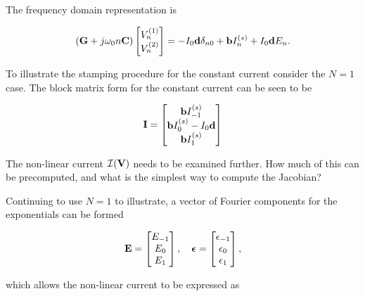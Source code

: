 \documentclass[12pt,journal,compsoc]{../ieeepaper/IEEEtran}
\begin{document}
The frequency domain representation is

\begin{equation}\label{eqn:ece1254projectReport:820}
\lr{ \BG + j \omega_0 n \BC } 
\begin{bmatrix}
V^{(1)}_n \\
V^{(2)}_n \\
\end{bmatrix}
=
-I_0 \Bd \delta_{n 0}
+
\Bb I^{(s)}_n
+ I_0 \Bd E_n.
\end{equation}

To illustrate the stamping procedure for the constant current consider the \( N = 1 \) case.  The block matrix form for the constant current can be seen to be

\begin{equation}\label{eqn:ece1254projectReport:840}
\BI
=
\begin{bmatrix}
\Bb I^{(s)}_{-1} \\
\Bb I^{(s)}_{0} - I_0 \Bd \\
\Bb I^{(s)}_{1} \\
\end{bmatrix}
\end{equation}

The non-linear current \( \mathcal{I}(\mathbf{V}) \) needs to be examined further.  How much of this can be precomputed, and what is the simplest way to compute the Jacobian?

Continuing to use \( N = 1 \) to illustrate, a vector of Fourier components for the exponentials can be formed

\begin{equation}\label{eqn:ece1254projectReport:880}
\BE =
\begin{bmatrix}
E_{-1} \\
E_{0} \\
E_{1} \\
\end{bmatrix}, \quad
\Bepsilon =
\begin{bmatrix}
\epsilon_{-1} \\
\epsilon_{0} \\
\epsilon_{1} \\
\end{bmatrix},
\end{equation}

which allows the non-linear current to be expressed as
\end{document}
